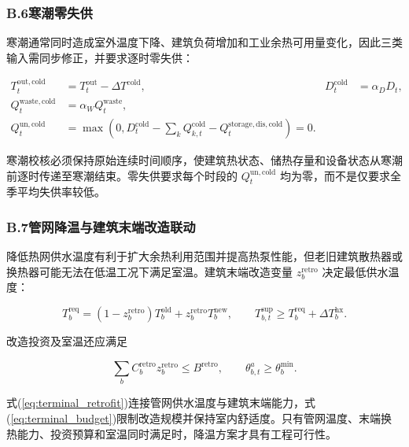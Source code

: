 \subsubsection*{B.6\quad 寒潮零失供}

寒潮通常同时造成室外温度下降、建筑负荷增加和工业余热可用量变化，因此三类输入需同步修正，并要求逐时零失供：

\begin{equation}
\begin{aligned}
T_t^{\mathrm{out,cold}}&=T_t^{\mathrm{out}}-\Delta T^{\mathrm{cold}},
&D_t^{\mathrm{cold}}&=\alpha_DD_t,\\
Q_t^{\mathrm{waste,cold}}&=\alpha_WQ_t^{\mathrm{waste}},\\
Q_t^{\mathrm{un,cold}}
&=\max\left(0,D_t^{\mathrm{cold}}-\sum_kQ_{k,t}^{\mathrm{cold}}
-Q_t^{\mathrm{storage,dis,cold}}\right)=0.
\end{aligned}
\label{eq:coldwave}
\end{equation}

寒潮校核必须保持原始连续时间顺序，使建筑热状态、储热存量和设备状态从寒潮前逐时传递至寒潮结束。零失供要求每个时段的 $Q_t^{\mathrm{un,cold}}$ 均为零，而不是仅要求全季平均失供率较低。

\subsubsection*{B.7\quad 管网降温与建筑末端改造联动}

降低热网供水温度有利于扩大余热利用范围并提高热泵性能，但老旧建筑散热器或换热器可能无法在低温工况下满足室温。建筑末端改造变量 $z_b^{\mathrm{retro}}$ 决定最低供水温度：

\begin{equation}
T_b^{\mathrm{req}}
=(1-z_b^{\mathrm{retro}})T_b^{\mathrm{old}}
+z_b^{\mathrm{retro}}T_b^{\mathrm{new}},
\qquad
T_{b,t}^{\mathrm{sup}}\geq T_b^{\mathrm{req}}+\Delta T_b^{\mathrm{hx}}.
\label{eq:terminal_retrofit}
\end{equation}

改造投资及室温还应满足

\begin{equation}
\sum_bC_b^{\mathrm{retro}}z_b^{\mathrm{retro}}\leq B^{\mathrm{retro}},
\qquad
\theta_{b,t}^{a}\geq\theta_b^{\min}.
\label{eq:terminal_budget}
\end{equation}

式(\ref{eq:terminal_retrofit})连接管网供水温度与建筑末端能力，式(\ref{eq:terminal_budget})限制改造规模并保持室内舒适度。只有管网温度、末端换热能力、投资预算和室温同时满足时，降温方案才具有工程可行性。

